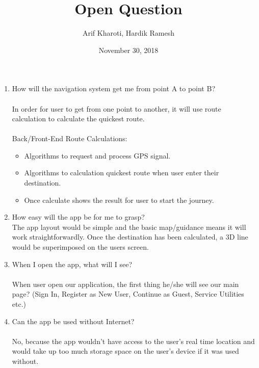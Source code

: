 \documentclass{article}
\title{Open Question}
\author{Arif Kharoti, Hardik Ramesh}
\date{November 30, 2018}
\begin{document}
\maketitle
\begin{enumerate}
    \item How will the navigation system get me from point A to point B?\\\\
    In order for user to get from one point to another, it will use route calculation to calculate the quickest route.\\\\
    Back/Front-End Route Calculations:
    \begin{itemize}
        \item Algorithms to request and process GPS signal.
        \item Algorithms to calculation quickest route when user enter their destination.
        \item Once calculate shows the result for user to start the journey.
    \end{itemize}
    
    \item How easy will the app be for me to grasp? \\
    
    The app layout would be simple and the basic map/guidance means it will work straightforwardly. Once the destination has been calculated, a 3D line would be superimposed on the users screen.
    
    \item When I open the app, what will I see?\\\\
    When user open our application, the first thing he/she will see our main page? (Sign In, Register as New User, Continue as Guest, Service Utilities etc.)
    
    \item Can the app be used without Internet?\\\\
    No, because the app wouldn't have access to the user's real time location and would take up too much storage space on the user's device if it was used without.
\end{enumerate}
\end{document}
